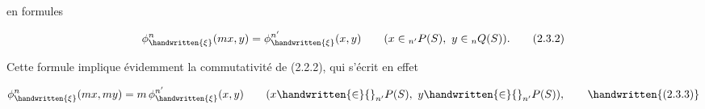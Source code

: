 
en formules

\[\phi_{\handwritten{\xi}}^n(mx,y)=\phi_{\handwritten{\xi}}^{n'}(x,y)\qquad(x\in{}_{n'}P(S),\ y\in{}_nQ(S)).\tag*{(2.3.2)}\]

Cette formule implique évidemment la commutativité de (2.2.2), qui s'écrit en effet

\[\phi_{\handwritten{\xi}}^n(mx,my)=m\,\phi_{\handwritten{\xi}}^{n'}(x,y)\qquad(x\handwritten{\in}{}_{n'}P(S),\ y\handwritten{\in}{}_{n'}P(S)),\tag*{\handwritten{(2.3.3)}}\]
\endgroup
